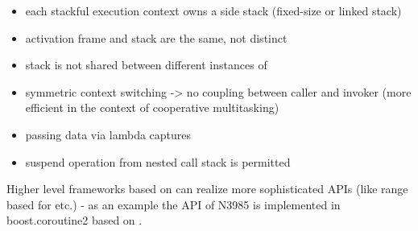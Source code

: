 \begin{itemize}
    \item   each stackful execution context owns a side stack (fixed-size or
            linked stack)
    \item   activation frame and stack are the same, not distinct
    \item   stack is not shared between different instances of \ectx
    \item   symmetric context switching -> no coupling between caller and
            invoker (more efficient in the context of cooperative multitasking)
    \item   passing data via lambda captures
    \item   suspend operation from nested call stack is permitted
\end{itemize}
Higher level frameworks based on \ectx can realize more sophisticated APIs
(like range based for etc.) - as an example the API of N3985\cite{N3985} is
implemented in boost.coroutine2\cite{bcoroutine2} based on
.
